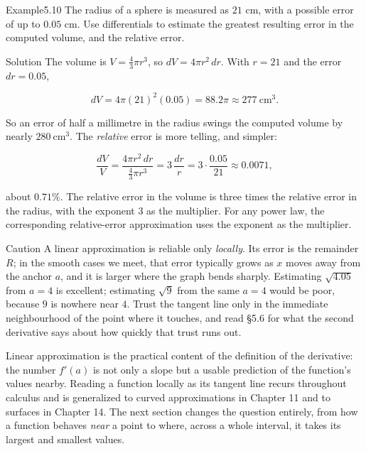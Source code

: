 \documentclass[a4paper,12pt,oneside]{memoir}
\begin{document}
\begin{workedexample}
\begin{envexample}{Example}{5.10}{}
The radius of a sphere is measured as \(21\) cm, with a possible error of up to \(0.05\) cm. Use differentials to estimate the greatest resulting error in the computed volume, and the relative error.
\end{envexample}
\begin{envsolution}{Solution}{}{}
The volume is \(V = \tfrac{4}{3}\pi r^{3}\), so \(dV = 4\pi r^{2}\,dr\). With \(r = 21\) and the error \(dr = 0.05\),

\[ dV = 4\pi (21)^{2}(0.05) = 88.2\pi \approx 277 \ \text{cm}^{3}. \]

So an error of half a millimetre in the radius swings the computed volume by nearly \(280\ \text{cm}^{3}\). The \emph{relative} error is more telling, and simpler:

\[ \frac{dV}{V} = \frac{4\pi r^{2}\,dr}{\tfrac{4}{3}\pi r^{3}} = 3\,\frac{dr}{r} = 3\cdot\frac{0.05}{21} \approx 0.0071, \]

about \(0.71\%\). The relative error in the volume is three times the relative error in the radius, with the exponent \(3\) as the multiplier. For any power law, the corresponding relative-error approximation uses the exponent as the multiplier. \qedmark
\end{envsolution}
\end{workedexample}
\begin{envcaution}{Caution}{}{}
A linear approximation is reliable only \emph{locally}. Its error is the remainder \(R\); in the smooth cases we meet, that error typically grows as \(x\) moves away from the anchor \(a\), and it is larger where the graph bends sharply. Estimating \(\sqrt{4.05}\) from \(a = 4\) is excellent; estimating \(\sqrt{9}\) from the same \(a = 4\) would be poor, because \(9\) is nowhere near \(4\). Trust the tangent line only in the immediate neighbourhood of the point where it touches, and read §5.6 for what the second derivative says about how quickly that trust runs out.
\end{envcaution}
Linear approximation is the practical content of the definition of the derivative: the number \(f'(a)\) is not only a slope but a usable prediction of the function’s values nearby. Reading a function locally as its tangent line recurs throughout calculus and is generalized to curved approximations in Chapter 11 and to surfaces in Chapter 14. The next section changes the question entirely, from how a function behaves \emph{near} a point to where, across a whole interval, it takes its largest and smallest values.
\end{document}
